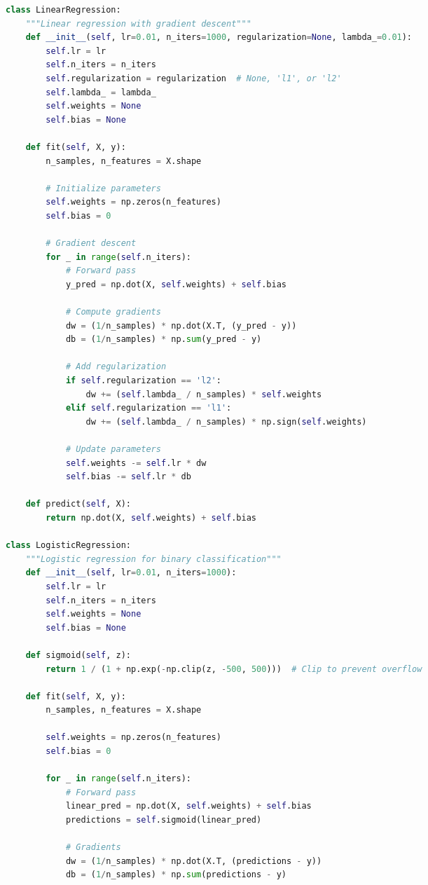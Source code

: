 \documentclass[8pt,landscape]{article}
\begin{document}
\begin{multicols}{3}
\begin{lstlisting}[language=Python]
class LinearRegression:
    """Linear regression with gradient descent"""
    def __init__(self, lr=0.01, n_iters=1000, regularization=None, lambda_=0.01):
        self.lr = lr
        self.n_iters = n_iters
        self.regularization = regularization  # None, 'l1', or 'l2'
        self.lambda_ = lambda_
        self.weights = None
        self.bias = None

    def fit(self, X, y):
        n_samples, n_features = X.shape

        # Initialize parameters
        self.weights = np.zeros(n_features)
        self.bias = 0

        # Gradient descent
        for _ in range(self.n_iters):
            # Forward pass
            y_pred = np.dot(X, self.weights) + self.bias

            # Compute gradients
            dw = (1/n_samples) * np.dot(X.T, (y_pred - y))
            db = (1/n_samples) * np.sum(y_pred - y)

            # Add regularization
            if self.regularization == 'l2':
                dw += (self.lambda_ / n_samples) * self.weights
            elif self.regularization == 'l1':
                dw += (self.lambda_ / n_samples) * np.sign(self.weights)

            # Update parameters
            self.weights -= self.lr * dw
            self.bias -= self.lr * db

    def predict(self, X):
        return np.dot(X, self.weights) + self.bias

class LogisticRegression:
    """Logistic regression for binary classification"""
    def __init__(self, lr=0.01, n_iters=1000):
        self.lr = lr
        self.n_iters = n_iters
        self.weights = None
        self.bias = None

    def sigmoid(self, z):
        return 1 / (1 + np.exp(-np.clip(z, -500, 500)))  # Clip to prevent overflow

    def fit(self, X, y):
        n_samples, n_features = X.shape

        self.weights = np.zeros(n_features)
        self.bias = 0

        for _ in range(self.n_iters):
            # Forward pass
            linear_pred = np.dot(X, self.weights) + self.bias
            predictions = self.sigmoid(linear_pred)

            # Gradients
            dw = (1/n_samples) * np.dot(X.T, (predictions - y))
            db = (1/n_samples) * np.sum(predictions - y)


\end{lstlisting}
\end{multicols}
\end{document}
